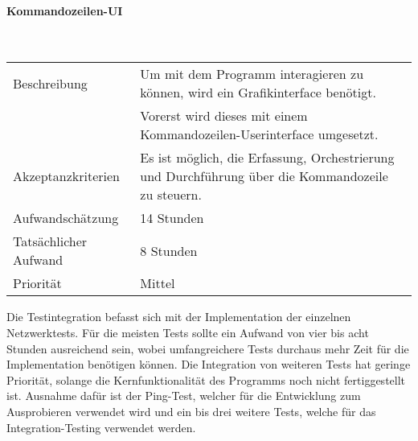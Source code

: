 \documentclass[]{subfiles}
\begin{document}
        \paragraph*{Kommandozeilen-UI}\mbox{} \\
        \begin{tabularx}{\textwidth}{lX}
            \toprule
            Beschreibung & Um mit dem Programm interagieren zu können, wird ein Grafikinterface benötigt.\\
             & Vorerst wird dieses mit einem Kommandozeilen-Userinterface umgesetzt.\\
            \midrule
            Akzeptanzkriterien & Es ist möglich, die Erfassung, Orchestrierung und Durchführung über die Kommandozeile zu steuern.\\
            \midrule
            Aufwandschätzung & 14 Stunden\\
            Tatsächlicher Aufwand & 8 Stunden\\ 
            \midrule
            Priorität & Mittel \\
            \bottomrule
        \end{tabularx}
        \newpage
    
        
    
        Die Testintegration befasst sich mit der Implementation der einzelnen Netzwerktests. 
        Für die meisten Tests sollte ein Aufwand von vier bis acht Stunden ausreichend sein, wobei umfangreichere Tests durchaus mehr Zeit für die Implementation benötigen können.
        Die Integration von weiteren Tests hat geringe Priorität, solange die Kernfunktionalität des Programms noch nicht fertiggestellt ist. 
        Ausnahme dafür ist der Ping-Test, welcher für die Entwicklung zum Ausprobieren verwendet wird und ein bis drei weitere Tests, welche für das Integration-Testing verwendet werden.
    
\end{document}
